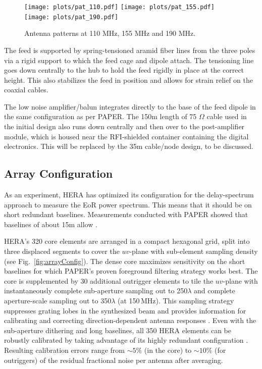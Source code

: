 \documentclass[preprint,11pt]{aastex}
\begin{document}
\begin{figure}[h!]
\centerline{
\texttt{[image: plots/pat\_110.pdf]}
\texttt{[image: plots/pat\_155.pdf]}
\texttt{[image: plots/pat\_190.pdf]}
}
\caption{\small Antenna patterns at 110 MHz, 155 MHz and 190 MHz.}
\label{fig:beampatterns}
\end{figure}


The feed is supported by spring-tensioned aramid fiber lines from the three poles via a rigid support to which the feed cage and dipole attach.  The tensioning line goes down centrally to the hub to hold the feed rigidly in place at the correct height.  This also stabilizes the feed in position and allows for strain relief on the coaxial cables.  

The low noise amplifier/balun integrates directly to the base of the feed dipole in the same configuration as per PAPER.  The 150m length of 75 $\Omega$ cable used in the initial design also runs down centrally and then over to the post-amplifier module, which is housed near the RFI-shielded container containing the digital electronics.  This will be replaced by the 35m cable/node design, to be discussed.


\subsection{Array Configuration}
\label{sec:arrayConfig}

As an experiment, HERA has optimized its configuration for the delay-spectrum approach to measure the EoR power spectrum.  This means that it should be on short redundant baselines.  Measurements conducted with PAPER showed that baselines of about 15m allow \cite{dillon_parsons2016}.

HERA's 320 core elements are arranged in a compact hexagonal grid, split into three displaced segments 
to cover the $uv$-plane with sub-element sampling density (see Fig.~\ref{fig:arrayConfig}). The dense core maximizes 
sensitivity on the short baselines for which PAPER's proven foreground filtering strategy works best.
The core is supplemented by 30 additional outrigger elements 
to tile the $uv$-plane with instantaneously complete sub-aperture 
sampling out to 250$\lambda$ and complete aperture-scale sampling out to 350$\lambda$ (at 150\,MHz). This sampling 
strategy suppresses grating lobes in the synthesized beam and provides information for calibrating and correcting 
direction-dependent antenna responses \citep{dillon_parsons2016}.
Even with the sub-aperture dithering and long baselines, all 350 HERA elements can be robustly calibrated by taking advantage of 
its highly redundant configuration \citep{liu_et_al2010,zheng_et_al2014}. 
Resulting calibration errors range from $\sim5\%$ (in the core) to $\sim10\%$ (for outriggers)
of the residual fractional noise per antenna after averaging.
\end{document}
